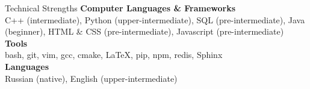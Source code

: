 \documentclass{resume} %
\begin{document}

\begin{rSection}{Technical Strengths}
{\bf Computer Languages \& Frameworks}\\ 
C++ (intermediate), Python (upper-intermediate), SQL (pre-intermediate), 
Java (beginner), HTML \& CSS (pre-intermediate), Javascript (pre-intermediate) \\
{\bf Tools} \\ 
bash, git, vim, gcc, cmake, LaTeX, pip, npm, redis, Sphinx \\
{\bf Languages} \\ 
Russian (native), English (upper-intermediate)
\end{rSection}





\end{document}
